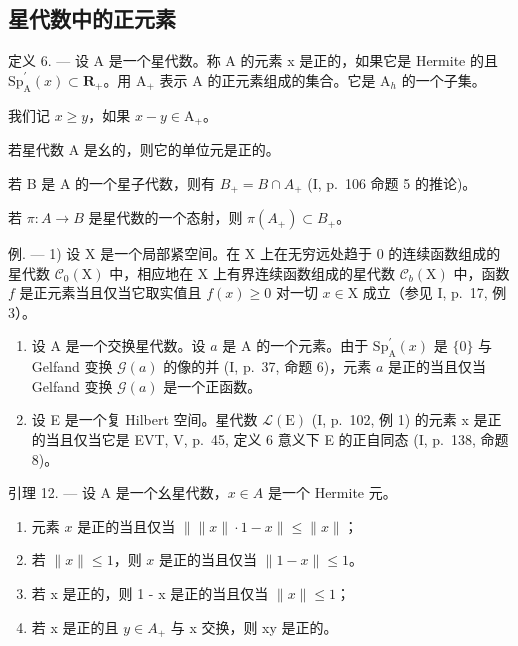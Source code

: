 \subsection{星代数中的正元素}

定义 6. --- 设 A 是一个星代数。称 A 的元素 x 是正的，如果它是 Hermite 的且 \(\mathrm{Sp}_{\mathrm{A}}^{\prime}(x) \subset \mathbf{R}_{+}\)。用 \(\mathrm{A}_{+}\) 表示 A 的正元素组成的集合。它是 \(\mathrm{A}_{h}\) 的一个子集。

我们记 \(x \geqslant y\)，如果 \(x - y \in \mathrm{A}_{+}\)。

若星代数 A 是幺的，则它的单位元是正的。

若 B 是 A 的一个星子代数，则有 \(B_{+} = B \cap A_{+}\) (I, p.~106 命题 5 的推论)。

若 \(\pi\colon A\to B\) 是星代数的一个态射，则 \(\pi(A_{+})\subset B_{+}\)。

例. --- 1) 设 X 是一个局部紧空间。在 X 上在无穷远处趋于 0 的连续函数组成的星代数 \(\mathcal{C}_{0}(\mathrm{X})\) 中，相应地在 X 上有界连续函数组成的星代数 \(\mathcal{C}_{b}(\mathrm{X})\) 中，函数 \(f\) 是正元素当且仅当它取实值且 \(f(x) \geqslant 0\) 对一切 \(x \in \mathrm{X}\) 成立（参见 I, p.~17, 例 3）。

\begin{enumerate}
\def\labelenumi{\arabic{enumi})}
\setcounter{enumi}{1}
\item
  设 A 是一个交换星代数。设 \(a\) 是 A 的一个元素。由于 \(\mathrm{Sp}_{\mathrm{A}}^{\prime}(x)\) 是 \(\{0\}\) 与 Gelfand 变换 \(\mathcal{G}(a)\) 的像的并 (I, p.~37, 命题 6)，元素 \(a\) 是正的当且仅当 Gelfand 变换 \(\mathcal{G}(a)\) 是一个正函数。
\item
  设 E 是一个复 Hilbert 空间。星代数 \(\mathcal{L}(\mathrm{E})\) (I, p.~102, 例 1) 的元素 x 是正的当且仅当它是 EVT, V, p.~45, 定义 6 意义下 E 的正自同态 (I, p.~138, 命题 8)。
\end{enumerate}

引理 12. --- 设 A 是一个幺星代数，\(x \in A\) 是一个 Hermite 元。

\begin{enumerate}
\def\labelenumi{\alph{enumi})}
\item
  元素 \(x\) 是正的当且仅当 \(\left\| \|x\| \cdot 1 - x \right\| \leqslant \|x\|\)；
\item
  若 \(\| x\| \leqslant 1\)，则 \(x\) 是正的当且仅当 \(\| 1 - x\| \leqslant 1\)。
\item
  若 x 是正的，则 1 - x 是正的当且仅当 \(\|x\| \leqslant 1\)；
\item
  若 x 是正的且 \(y \in A_{+}\) 与 x 交换，则 xy 是正的。
\end{enumerate}

